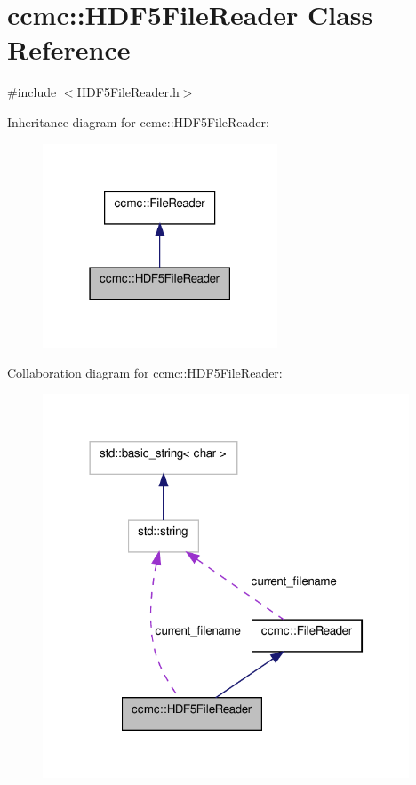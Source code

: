 \hypertarget{classccmc_1_1_h_d_f5_file_reader}{
\section{ccmc::HDF5FileReader Class Reference}
\label{classccmc_1_1_h_d_f5_file_reader}
}


{\ttfamily \#include $<$HDF5FileReader.h$>$}



Inheritance diagram for ccmc::HDF5FileReader:
\nopagebreak
\begin{figure}[H]
\begin{center}
\leavevmode
\includegraphics[width=198pt]{classccmc_1_1_h_d_f5_file_reader__inherit__graph}
\end{center}
\end{figure}


Collaboration diagram for ccmc::HDF5FileReader:
\nopagebreak
\begin{figure}[H]
\begin{center}
\leavevmode
\includegraphics[width=309pt]{classccmc_1_1_h_d_f5_file_reader__coll__graph}
\end{center}
\end{figure}
